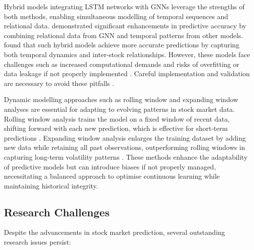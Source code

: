 Hybrid models integrating LSTM networks with GNNs leverage the strengths of both methods, enabling simultaneous modelling of temporal sequences and relational data. \citet{cheng2022} demonstrated significant enhancements in predictive accuracy by combining relational data from GNN and temporal patterns from other models. \citet{shi2024} found that such hybrid models achieve more accurate predictions by capturing both temporal dynamics and inter-stock relationships. However, these models face challenges such as increased computational demands and risks of overfitting or data leakage if not properly implemented \citep{tang2021}. Careful implementation and validation are necessary to avoid these pitfalls \citep{mehtab2020}.

Dynamic modelling approaches such as rolling window and expanding window analyses are essential for adapting to evolving patterns in stock market data. Rolling window analysis trains the model on a fixed window of recent data, shifting forward with each new prediction, which is effective for short-term predictions \citep{matsunaga2019}. Expanding window analysis enlarges the training dataset by adding new data while retaining all past observations, outperforming rolling windows in capturing long-term volatility patterns \citep{feng2024}. These methods enhance the adaptability of predictive models but can introduce biases if not properly managed, necessitating a balanced approach to optimise continuous learning while maintaining historical integrity.

\subsection{Research Challenges}

Despite the advancements in stock market prediction, several outstanding research issues persist:

